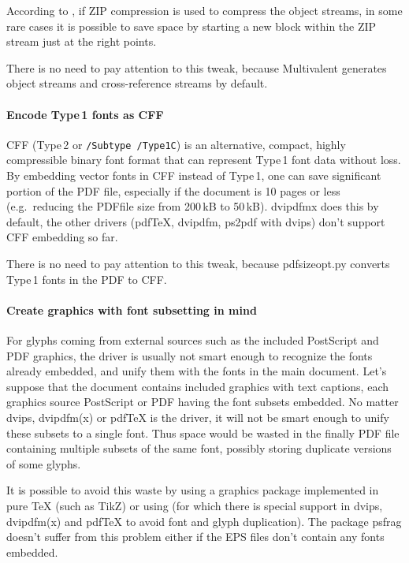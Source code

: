 \documentclass{ltugproc}
\def\cmd{\textsf}
\def\pkg{\textsf}
\begin{document}
According to \cite{pdf-diet}, if ZIP compression is used to compress the object
streams, in some rare cases it is possible to save space by starting a new
block within the ZIP stream just at the right points.

There is no need to pay attention to this tweak, because
Multivalent generates object streams and cross-reference streams by default.

\paragraph{Encode Type\,1 fonts as CFF}

CFF \cite{cff} (Type\,2 or \texttt{/Subtype /Type1C})
is an alternative, compact, highly compressible binary font
format that can represent Type\,1 font data without loss. By embedding
vector fonts in CFF instead of Type\,1, one can
save significant portion of the PDF file, especially if the document is 10
pages or less (e.g.\ reducing the PDFfile size from 200\,kB to 50\,kB).
\cmd{dvipdfmx} does this by default, the other drivers (pdf\TeX{},
\cmd{dvipdfm}, \cmd{ps2pdf} with \cmd{dvips}) don't support CFF embedding so
far.

There is no need to pay attention to this tweak, because
\cmd{pdfsizeopt.py} converts Type\,1 fonts in the PDF to CFF. 

\paragraph{Create graphics with font subsetting in mind}

For glyphs coming from external sources such as the included PostScript and
PDF graphics, the driver is usually not smart enough to recognize the fonts
already embedded, and unify them with the fonts in the main document. Let's
suppose that the document contains included graphics with text captions,
each graphics source PostScript or PDF having the font subsets embedded. No
matter \cmd{dvips}, \cmd{dvipdfm(x)} or pdf\TeX{} is the driver, it will not
be smart enough to unify these subsets to a single font. Thus space would be
wasted in the finally PDF file containing multiple subsets of the same font,
possibly storing duplicate versions of some glyphs.

It is possible to avoid this waste by using a graphics package implemented in
pure \TeX{} (such as TikZ) or using \MP{} (for which there is
special support in \cmd{dvips}, \cmd{dvipdfm(x)} and pdf\TeX{} to avoid font
and glyph duplication). The package \pkg{psfrag} doesn't suffer from this
problem either if the EPS files don't contain any fonts embedded.
\end{document}
